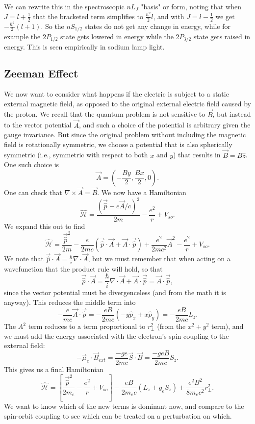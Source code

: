 \documentclass[fontsize=12pt]{scrartcl}
\newcommand{\mom}{\hat{p}}
\newcommand{\momv}{\vec{\hat{p}}}
\newcommand{\Ham}{\hat{\mathcal{H}}}
\begin{document}
We can rewrite this in the spectroscopic $nL_J$ "basis" or form, noting that when $J=l+\frac{1}{2}$ that the bracketed term simplifies to $\frac{\hbar^2}{2}l$, and with $J=l-\frac{1}{2}$ we get $-\frac{\hbar^2}{2}(l+1)$. So the $nS_{1/2}$ states do not get any change in energy, while for example the $2P_{1/2}$ state gets lowered in energy while the $2P_{3/2}$ state gets raised in energy. This is seen empirically in sodium lamp light.

\subsection{Zeeman Effect}

We now want to consider what happens if the electric is subject to a static external magnetic field, as opposed to the original external electric field caused by the proton. We recall that the quantum problem is not sensitive to $\vec{B}$, but instead to the vector potential $\vec{A}$, and such a choice of the potential is arbitrary given the gauge invariance. But since the original problem without including the magnetic field is rotationally symmetric, we choose a potential that is also spherically symmetric (i.e., symmetric with respect to both $x$ and $y$) that results in $\vec{B}=B\hat{z}$. One such choice is $$\vec{A}=\left(-\frac{By}{2},\frac{Bx}{2}, 0\right).$$ One can check that $\nabla\times\vec{A}=\vec{B}$. We now have a Hamiltonian $$\Ham=\frac{(\momv-e\vec{A}/c)^2}{2m}-\frac{e^2}{r}+V_{so}.$$ We expand this out to find $$\Ham=\frac{\momv^2}{2m}-\frac{e}{2mc}(\momv\cdot\vec{A}+\vec{A}\cdot\momv)+\frac{e^2}{2mc^2}\vec{A}^2-\frac{e^2}{r}+V_{so}.$$ We note that $\momv\cdot\vec{A}=\frac{\hbar}{i}\nabla\cdot\vec{A}$, but we must remember that when acting on a wavefunction that the product rule will hold, so that $$\momv\cdot\vec{A}=\frac{\hbar}{i}\nabla\cdot\vec{A}+\vec{A}\cdot\momv=\vec{A}\cdot\momv,$$ since the vector potential must be divergenceless (and from the math it is anyway). This reduces the middle term into $$-\frac{e}{mc}\vec{A}\cdot\momv = -\frac{eB}{2mc}(-y\mom_x+x\mom_y)=-\frac{eB}{2mc}L_z.$$ The $A^2$ term reduces to a term proportional to $r_\perp^2$ (from the $x^2+y^2$ term), and we must add the energy associated with the electron's spin coupling to the external field: $$-\vec{\mu}_e\cdot\vec{B}_{ext}=\frac{-ge}{2mc}\vec{S}\cdot\vec{B}=\frac{-geB}{2mc}S_z.$$ This gives us a final Hamiltonian $$\Ham=\left[\frac{\momv^2}{2m_e}-\frac{e^2}{r}+V_{so}\right] -\frac{eB}{2m_ec}\left(L_z+g_eS_z\right)+\frac{e^2B^2}{8m_ec^2}r_\perp^2.$$ We want to know which of the new terms is dominant now, and compare to the spin-orbit coupling to see which can be treated on a perturbation on which.
\end{document}
